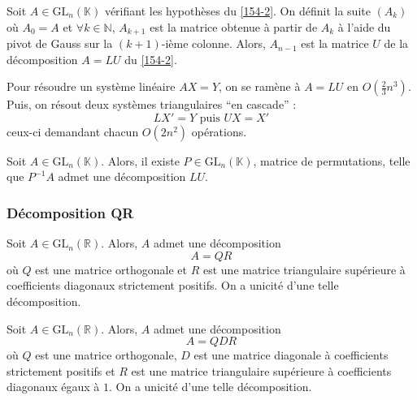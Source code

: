 
  \begin{proposition}
    Soit $A \in \mathrm{GL}_n(\mathbb{K})$ vérifiant les hypothèses du \cref{154-2}. On définit la suite $(A_k)$ où $A_0 = A$ et $\forall k \in \mathbb{N}$, $A_{k+1}$ est la matrice obtenue à partir de $A_k$ à l'aide du pivot de Gauss sur la $(k+1)$-ième colonne. Alors, $A_{n-1}$ est la matrice $U$ de la décomposition $A = LU$ du \cref{154-2}.
  \end{proposition}

  \begin{remark}
    Pour résoudre un système linéaire $AX = Y$, on se ramène à $A = LU$ en $O \left( \frac{2}{3}n^3 \right)$. Puis, on résout deux systèmes triangulaires ``en cascade'' :
    \[ LX' = Y \text{ puis } UX = X' \]
    ceux-ci demandant chacun $O(2n^2)$ opérations.
  \end{remark}

  \begin{theorem}
    Soit $A \in \mathrm{GL}_n(\mathbb{K})$. Alors, il existe $P \in \mathrm{GL}_n(\mathbb{K})$, matrice de permutations, telle que $P^{-1}A$ admet une décomposition $LU$.
  \end{theorem}

  \subsubsection{Décomposition QR}


  \begin{theorem}[Décomposition QR]
    Soit $A \in \mathrm{GL}_n(\mathbb{R})$. Alors, $A$ admet une décomposition
    \[ A = QR \]
    où $Q$ est une matrice orthogonale et $R$ est une matrice triangulaire supérieure à coefficients diagonaux strictement positifs. On a unicité d'une telle décomposition.
  \end{theorem}

  \begin{corollary}
    Soit $A \in \mathrm{GL}_n(\mathbb{R})$. Alors, $A$ admet une décomposition
    \[ A = QDR \]
    où $Q$ est une matrice orthogonale, $D$ est une matrice diagonale à coefficients strictement positifs et $R$ est une matrice triangulaire supérieure à coefficients diagonaux égaux à $1$. On a unicité d'une telle décomposition.
  \end{corollary}



